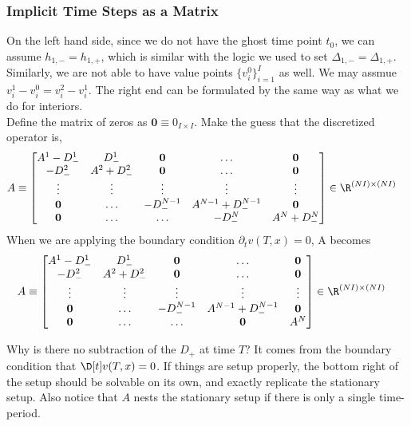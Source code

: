 \documentclass[11pt]{etk-article}
\begin{document}
\subsubsection{Implicit Time Steps as a Matrix}
On the left hand side, since we do not have the ghost time point $t_0$, we can assume $h_{1, -} = h_{1, +}$, which is similar with the logic we used to set $\Delta_{1, -} = \Delta_{1, +}$. Similarly, we are not able to have value points $\{v_i^0\}_{i=1}^I$ as well. We may assmue $v_i^1 - v_i^0 = v_i^2 - v_i^1$. The right end can be formulated by the same way as what we do for interiors. \\
Define the matrix of zeros as $\mathbf{0} \equiv 0_{I\times I}$. Make the guess that the discretized operator is,
\begin{align}
A &\equiv \begin{bmatrix}
	A^1 - D_{-}^1	&D_{-}^1			& \mathbf{0}			 & \ldots 			& \mathbf{0}\\
	-D_{-}^2		 &A^2 + D_{-}^2 &\mathbf{0}  				 & \ldots			 & \mathbf{0}\\	
	\vdots 			& \vdots 		& \vdots				& \vdots			&\vdots\\
	\mathbf{0} 		&\ldots 	 	& -D_{-}^{N-1}				& A^{N-1} + D_{-}^{N-1} &\mathbf{0}\\
	\mathbf{0} 		&\ldots 		&\ldots						& -D_{-}^{N}	&A^N+D_{-}^{N}
	\end{bmatrix}\in\R^{(N I)\times (N I)}  \label{A-with-implicit-t}
\end{align}
When we are applying the boundary condition $\partial_t v(T, x) = 0$, A becomes
\begin{align}
A &\equiv \begin{bmatrix}
	A^1 - D_{-}^1	&D_{-}^1			& \mathbf{0}			 & \ldots 			& \mathbf{0}\\
	-D_{-}^2		 &A^2 + D_{-}^2 &\mathbf{0}  				 & \ldots			 & \mathbf{0}\\	
	\vdots 			& \vdots 		& \vdots				& \vdots			&\vdots\\
	\mathbf{0} 		&\ldots 	 	& -D_{-}^{N-1}				& A^{N-1} + D_{-}^{N-1} &\mathbf{0}\\
	\mathbf{0} 		&\ldots 		&\ldots						& \mathbf{0}	&A^N
	\end{bmatrix}\in\R^{(N I)\times (N I)}
\end{align}


Why is there no subtraction of the $D_{+}$ at time $T$?  It comes from the boundary condition that $\D[t]v(T,x) = 0$.  If things are setup properly, the bottom right of the setup should be solvable on its own, and exactly replicate the stationary setup.  Also notice that $A$ nests the stationary setup if there is only a single time-period. 
\end{document}
